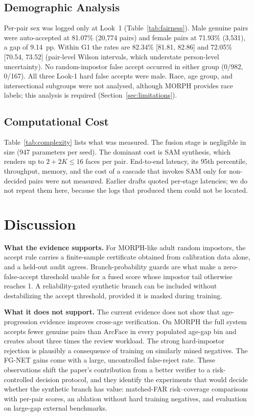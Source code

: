 \documentclass[journal]{IEEEtran}
\begin{document}


\subsection{Demographic Analysis}

Per-pair sex was logged only at Look~1 (Table~\ref{tab:fairness}). Male genuine pairs were auto-accepted at 81.07\% (20,774 pairs) and female pairs at 71.93\% (3,531), a gap of 9.14~pp. Within G1 the rates are 82.34\% [81.81, 82.86] and 72.05\% [70.54, 73.52] (pair-level Wilson intervals, which understate person-level uncertainty). No random-impostor false accept occurred in either group (0/982, 0/167). All three Look-1 hard false accepts were male. Race, age group, and intersectional subgroups were not analysed, although MORPH provides race labels; this analysis is required (Section~\ref{sec:limitations}).

\subsection{Computational Cost}

Table~\ref{tab:complexity} lists what was measured. The fusion stage is negligible in size (947 parameters per seed). The dominant cost is SAM synthesis, which renders up to $2+2K\le16$ faces per pair. End-to-end latency, its 95th percentile, throughput, memory, and the cost of a cascade that invokes SAM only for non-decided pairs were not measured. Earlier drafts quoted per-stage latencies; we do not repeat them here, because the logs that produced them could not be located.

\section{Discussion}
\label{sec:discussion}
\textbf{What the evidence supports.} For MORPH-like adult random impostors, the accept rule carries a finite-sample certificate obtained from calibration data alone, and a held-out audit agrees. Branch-probability guards are what make a zero-false-accept threshold usable for a fused score whose impostor tail otherwise reaches 1. A reliability-gated synthetic branch can be included without destabilizing the accept threshold, provided it is masked during training.

\textbf{What it does not support.} The current evidence does not show that age-progression evidence improves cross-age verification. On MORPH the full system accepts fewer genuine pairs than ArcFace in every populated age-gap bin and creates about three times the review workload. The strong hard-impostor rejection is plausibly a consequence of training on similarly mined negatives. The FG-NET gains come with a large, uncontrolled false-reject rate. These observations shift the paper's contribution from a better verifier to a risk-controlled decision protocol, and they identify the experiments that would decide whether the synthetic branch has value: matched-FAR risk--coverage comparisons with per-pair scores, an ablation without hard training negatives, and evaluation on large-gap external benchmarks.
\end{document}
